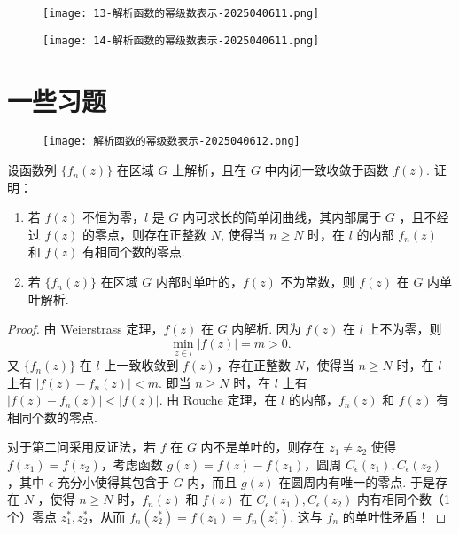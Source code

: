 \begin{figure}[H]
\centering
\texttt{[image: 13-解析函数的幂级数表示-2025040611.png]}
\label{}
\end{figure}

\begin{figure}[H]
\centering
\texttt{[image: 14-解析函数的幂级数表示-2025040611.png]}
\label{}
\end{figure}

\section{一些习题}

\begin{figure}[H]
\centering
\texttt{[image: 解析函数的幂级数表示-2025040612.png]}
\label{}
\end{figure}

\begin{exercise}
设函数列 $\{ f_n(z) \}$ 在区域 $G$ 上解析，且在 $G$ 中内闭一致收敛于函数 $f(z)$. 证明：
	\begin{enumerate}
		\item 若 $f(z)$ 不恒为零，$l$ 是 $G$ 内可求长的简单闭曲线，其内部属于 $G$ ，且不经过 $f(z)$ 的零点，则存在正整数 $N$, 使得当 $n\geq N$ 时，在 $l$ 的内部 $f_n(z)$ 和 $f(z)$ 有相同个数的零点.
		\item 若 $\{ f_n(z) \}$ 在区域 $G$ 内部时单叶的，$f(z)$ 不为常数，则 $f(z)$ 在 $G$ 内单叶解析.
	\end{enumerate}
\end{exercise}
\begin{proof}
由 Weierstrass 定理，$f(z)$ 在 $G$ 内解析. 因为 $f(z)$ 在 $l$ 上不为零，则
\[
\min_{z\in l}\lvert f(z) \rvert =m>0.
\]
又 $\{ f_n(z) \}$ 在 $l$ 上一致收敛到 $f(z)$，存在正整数 $N$，使得当 $n\geq N$ 时，在 $l$ 上有 $\lvert f(z)-f_n(z) \rvert<m$. 即当 $n\geq N$ 时，在 $l$ 上有 $\lvert f(z)-f_n(z) \rvert<\lvert f(z) \rvert$. 由 Rouche 定理，在 $l$ 的内部，$f_n(z)$ 和 $f(z)$ 有相同个数的零点.

对于第二问采用反证法，若 $f$ 在 $G$ 内不是单叶的，则存在 $z_1\neq z_2$ 使得 $f(z_1)=f(z_2)$，考虑函数 $g(z)=f(z)-f(z_1)$，圆周 $C_{\epsilon}(z_1),C_{\epsilon}(z_2)$，其中 $\epsilon$ 充分小使得其包含于 $G$ 内，而且 $g(z)$ 在圆周内有唯一的零点. 于是存在 $N$ ，使得 $n\geq N$ 时，$f_n(z)$ 和 $f(z)$ 在 $C_{\epsilon}(z_1),C_{\epsilon}(z_2)$ 内有相同个数（1 个）零点 $z_1^{*},z_2^{*}$，从而 $f_n(z_2^{*})=f(z_1)=f_n(z_1^{*})$. 这与 $f_n$ 的单叶性矛盾！
\end{proof}

